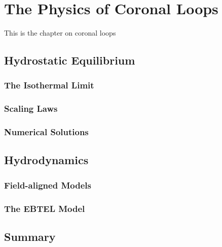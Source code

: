 \chapter{The Physics of Coronal Loops}\label{ch:loops}


This is the chapter on coronal loops

\section{Hydrostatic Equilibrium}



\subsection{The Isothermal Limit}

\subsection{Scaling Laws}\label{sec:scaling_laws}


\subsection{Numerical Solutions}


\section{Hydrodynamics}


\subsection{Field-aligned Models}


\subsection{The EBTEL Model}\label{sec:ebtel}


\section{Summary}

